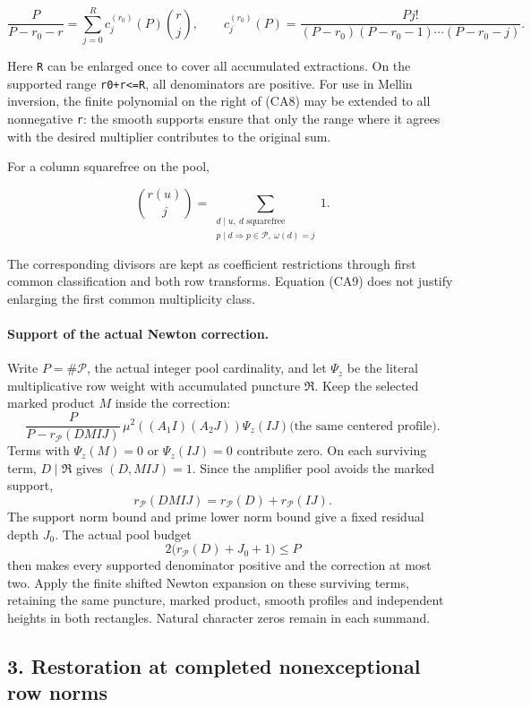 \[
 \frac{P}{P-r_0-r}
 =\sum_{j=0}^{R}c_j^{(r_0)}(P)\binom rj,
 \qquad
 c_j^{(r_0)}(P)=
 \frac{Pj!}{(P-r_0)(P-r_0-1)\cdots(P-r_0-j)}.
\tag{CA8}
\]

Here \texttt{R} can be enlarged once to cover all accumulated extractions. On the supported range \texttt{r0+r\textless{}=R}, all denominators are positive. For use in Mellin inversion, the finite polynomial on the right of (CA8) may be extended to all nonnegative \texttt{r}: the smooth supports ensure that only the range where it agrees with the desired multiplier contributes to the original sum.

For a column squarefree on the pool,

\[
 \binom{r(u)}j
 =\sum_{\substack{d\mid u,\ d\text{ squarefree}\\
                  p\mid d\Rightarrow p\in\mathcal P,\ \omega(d)=j}}1.
\tag{CA9}
\]

The corresponding divisors are kept as coefficient restrictions through first common classification and both row transforms. Equation (CA9) does not justify enlarging the first common multiplicity class.


\paragraph{Support of the actual Newton correction.}
Write \(P=\#\mathcal P\), the actual integer pool cardinality, and let
\(\Psi_z\) be the literal multiplicative row weight with accumulated
puncture \(\mathfrak R\). Keep the selected marked product \(M\) inside
the correction:
\[
 \frac{P}{P-r_{\mathcal P}(DMIJ)}\,
 \mu^2((A_1I)(A_2J))\Psi_z(IJ)
 \bigl(\text{the same centered profile}\bigr).
\]
Terms with \(\Psi_z(M)=0\) or \(\Psi_z(IJ)=0\) contribute zero. On
each surviving term, \(D\mid\mathfrak R\) gives \((D,MIJ)=1\).
Since the amplifier pool avoids the marked support,
\[
 r_{\mathcal P}(DMIJ)=r_{\mathcal P}(D)+r_{\mathcal P}(IJ).
\]
The support norm bound and prime lower norm bound give a fixed residual
depth \(J_0\). The actual pool budget
\[
 2\bigl(r_{\mathcal P}(D)+J_0+1\bigr)\le P
\]
then makes every supported denominator positive and the correction at
most two. Apply the finite shifted Newton expansion on these surviving
terms, retaining the same puncture, marked product, smooth profiles and
independent heights in both rectangles. Natural character zeros remain
in each summand.

\hypertarget{sources:restoration-at-completed-nonexceptional-row-norms}{%
\subsection{3. Restoration at completed nonexceptional row norms}\label{sources:restoration-at-completed-nonexceptional-row-norms}}

